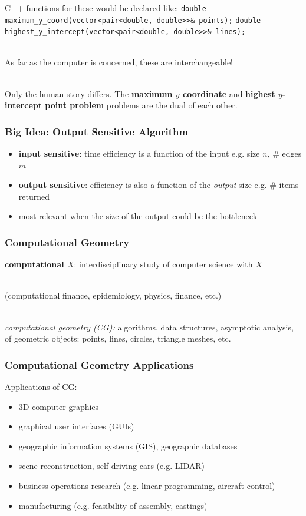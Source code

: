 \documentclass{beamer}
\newcommand{\stanza}{ \\~\ }
\begin{document}
  \begin{frame} \frametitle{}
  C++ functions for these would be declared like:
  \lstinline!double maximum_y_coord(vector<pair<double, double>>& points);!
  \lstinline!double highest_y_intercept(vector<pair<double, double>>& lines);! \stanza
  
  As far as the computer is concerned, these are interchangeable! \stanza
  
  Only the human story differs.
  The
  \textbf{maximum $y$ coordinate}
  and
  \textbf{highest $y$-intercept point problem}
  problems are the dual of each other.
\end{frame}

\begin{frame} \frametitle{Big Idea: Output Sensitive Algorithm}
  \begin{itemize}
    \item \textbf{input sensitive}: time efficiency is a function of the input
      e.g. size $n$, \# edges $m$
    \item \textbf{output sensitive}: efficiency is also a function of the
      \emph{output} size e.g. \# items returned
    \item most relevant when the size of the output could be the
      bottleneck
  \end{itemize}
\end{frame}

\begin{frame} \frametitle{Computational Geometry}
\textbf{computational $X$}: interdisciplinary study of computer science with $X$ \stanza

(computational finance, epidemiology, physics, finance, etc.) \stanza

\emph{computational geometry (CG):} algorithms, data structures, asymptotic analysis, of
geometric objects: points, lines, circles, triangle meshes, etc.
\end{frame}

\begin{frame} \frametitle{Computational Geometry Applications}

Applications of CG:
\begin{itemize}
  \item 3D computer graphics
  \item graphical user interfaces (GUIs)
  \item geographic information systems (GIS), geographic databases
  \item scene reconstruction, self-driving cars (e.g. LIDAR)
  \item business operations research (e.g. linear programming, aircraft control)
  \item manufacturing (e.g. feasibility of assembly, castings)
\end{itemize}
\end{frame}
\end{document}
